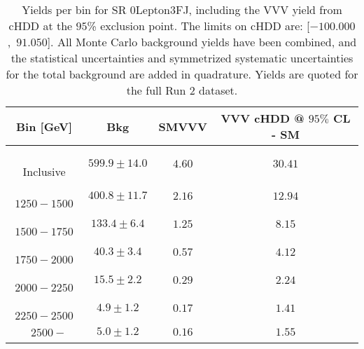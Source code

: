\begin{table}[!htbp]
    \small
    \center
    \begin{tabular}{c||c|c|c}
    Bin [GeV] & Bkg & SMVVV & \pbox{20cm}{VVV \\ cHDD @ $95\%$ CL - SM \\ }\\
    \hline
    \pbox{20cm}{ ~ \\Inclusive\\ } & $599.9 \pm 14.0$ & $4.60$ & $30.41$\\
    \hline
    \pbox{20cm}{ ~ \\$1250-1500$\\ } & $400.8 \pm 11.7$ & $2.16$ & $12.94$\\
    \hline
    \pbox{20cm}{ ~ \\$1500-1750$\\ } & $133.4 \pm 6.4$ & $1.25$ & $8.15$\\
    \hline
    \pbox{20cm}{ ~ \\$1750-2000$\\ } & $40.3 \pm 3.4$ & $0.57$ & $4.12$\\
    \hline
    \pbox{20cm}{ ~ \\$2000-2250$\\ } & $15.5 \pm 2.2$ & $0.29$ & $2.24$\\
    \hline
    \pbox{20cm}{ ~ \\$2250-2500$\\ } & $4.9 \pm 1.2$ & $0.17$ & $1.41$\\
    \hline
    \pbox{20cm}{ ~ \\$2500-$\\ } & $5.0 \pm 1.2$ & $0.16$ & $1.55$\\
\end{tabular}
    \caption{Yields per bin for SR 0Lepton3FJ, including the VVV yield from cHDD at the $95$\% exclusion point. The limits on cHDD are: [$-100.000$,~$91.050$]. All Monte Carlo background yields have been combined, and the statistical uncertainties and symmetrized systematic uncertainties for the total background are added in quadrature. Yields are quoted for the full Run 2 dataset.}
    \label{tab:0Lepton3FJ$binssignal}
\end{table}
